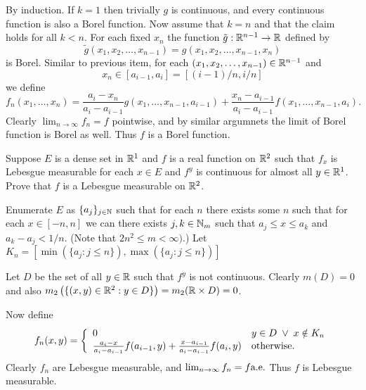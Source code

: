 \begin{enumerate}
\begin{itemize}
By induction. If \(k=1\) then trivially $g$ is continuous,
and every continuous function is also a Borel function.
Now assume that \(k=n\) and that the claim holds for all \(k<n\).
For each fixed \(x_n\) the function \(\tilde{g}:\mathbb{R}^{n-1}\to\mathbb{R}\) defined by 
\begin{equation*}
\tilde{g}(x_1,x_2,\ldots,x_{n-1}) = g(x_1,x_2,\ldots,x_{n-1},x_n)
\end{equation*}
is Borel.
Similar to previous item, 
for each \((x_1,x_2,\ldots,x_{n-1})\in\mathbb{R}^{n-1}\) and 
\begin{equation*}
x_n \in [a_{i-1},a_i] = [(i-1)/n, i/n]
\end{equation*}
we define
\begin{equation*}
f_n(x_1,\ldots,x_n) = 
\frac{a_i - x_n}{a_i - a_{i-1}} g(x_1,\ldots,x_{n-1},a_{i-1}) 
+
\frac{x_n - a_{i-1}}{a_i - a_{i-1}} f(x_1,\ldots,x_{n-1},a_i).
\end{equation*}
Clearly \(\lim_{n\to\infty} f_n = f\) pointwise, and by similar argumnets 
the limit of Borel function is Borel as well. Thus $f$ is a Borel function.
\end{itemize}


\begin{excopy}
Suppose $E$ is a dense set in \(\mathbb{R}^1\) and $f$ is a real function on \(\mathbb{R}^2\)
such that 
 \(f_x\) is Lebesgue measurable for each \(x\in E\) and 
 \(f^y\) is continuous for almost all  \(y\in \mathbb{R}^1\).
Prove that $f$ is a Lebesgue measurable on \(\mathbb{R}^2\).
\end{excopy}

Enumerate $E$ as \(\{a_j\}_{j\in\mathbb{N}}\) such that for each $n$ 
there exists some $n$ such that 
for each \(x\in[-n,n]\) we can there exists \(j,k\in\mathbb{N}_m\)
such that \(a_j\leq x \leq a_k\) and \(a_k-a_j < 1/n\).
(Note that \(2n^2 \leq m < \infty)\).) Let
\(K_n = \left[\min(\{a_j: j\leq n\}), \max(\{a_j: j\leq n\})\right]\)

Let $D$ be the set of all \(y\in\mathbb{R}\) such that \(f^y\) is not continuous.
Clearly \(m(D)=0\) and also 
\(m_2\left(\{(x,y)\in\mathbb{R}^2: y\in D\}\right) = m_2(\mathbb{R}\times D) = 0\).

Now define 
\begin{equation*}
f_n(x,y) = \left\{
\begin{array}{ll}
0 & y \in D \;\vee\; x \notin K_n \\
\frac{a_i - x}{a_i - a_{i-1}} f(a_{i-1}, y) 
+
\frac{x - a_{i-1}}{a_i - a_{i-1}} f(a_i, y) & \textnormal{otherwise}.
\end{array}
\right.
\end{equation*}
Clearly \(f_n\) are Lebesgue measurable, and
\(\lim_{n\to\infty} f_n = f \textrm{a.e.}\) Thus $f$ is Lebesgue measurable.



\end{enumerate}
